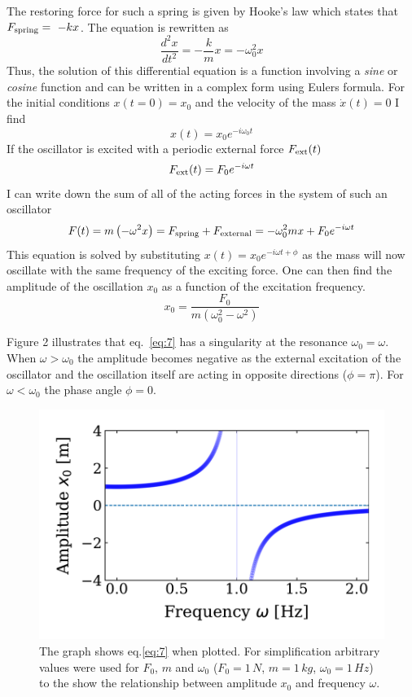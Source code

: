 \documentclass[12pt]{article}
\begin{document}
The restoring force for such a spring is given by Hooke's law which states that $F_{\rm spring}=~-kx$. The  equation is rewritten as
\begin{equation}\label{eq:diff_eq}
    \frac{d^2 x}{dt^2}=-\frac{k}{m}x =-\omega_{0}^{2}x
\end{equation}
Thus, the solution of this differential equation is a function involving a {\it sine} or {\it cosine} function and can be written in a complex form using Eulers formula. For the initial conditions $x(t=0)=x_0$ and the velocity of the mass $\dot{x}(t)=0$ I find
\begin{equation}\label{eq:3}
x(t)= x_0 e^{-i\omega_0 t}
\end{equation}
If the oscillator is excited with a periodic external force $F_{\rm ext}(t)$
\begin{equation}\label{eq:4}
  F_{\rm ext}(t)=F_{0}e^{-i\omega t}
\end{equation}
I can write down the sum of all of the acting forces in the system of such an oscillator
\begin{equation}\label{eq:5}
F(t)=m\left(-\omega^{2} x \right)=F_{\rm spring}+F_{\rm external}= -\omega^{2}_0mx + F_0e^{-i\omega t}
\end{equation}
This  equation is solved by substituting  $x(t)=x_0 e^{-i\omega t+\phi}$ as the mass will now oscillate with the same frequency of the exciting force. One can then find the amplitude of the oscillation $x_{0}$ as a function of the excitation frequency. 
\begin{equation}\label{eq:7}
  x_0=\frac{F_0}{m(\omega_0^2 - \omega^2)}
\end{equation}

Figure 2 illustrates that eq.~\ref{eq:7} has a singularity at the resonance  $\omega_0 = \omega$.  When $\omega > \omega_0$ the amplitude becomes negative as the external excitation of the oscillator and the oscillation itself are acting in opposite directions ($\phi=\pi$). For $\omega < \omega_0$ the phase angle $\phi=0$.

\begin{figure}[hbt]
  \includegraphics[width=0.5\columnwidth]{fundamentals/driven_harmonic_oscillator}
  \caption{The graph shows eq.\ref{eq:7} when plotted. For simplification arbitrary values were used for $F_0$, $m$ and $\omega_0$ ($F_0=1\, N$, $m = 1 \,kg$, $\omega_0 = 1\, Hz$) to the show the relationship between amplitude $x_0$ and frequency $\omega$.}
\end{figure}
\end{document}
